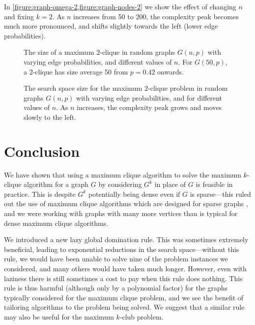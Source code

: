 \documentclass[letterpaper]{article}
\begin{document}
In \cref{figure:graph-omega-2,figure:graph-nodes-2} we show the effect of
changing $n$ and fixing $k = 2$. As $n$ increases from 50 to 200, the complexity peak becomes much
more pronounced, and shifts slightly towards the left (lower edge probabilities).

\begin{figure}[t]
    \centering
    
    \caption{The size of a maximum $2$-clique in random graphs $G(n, p)$ with varying edge
        probabilities, and different values of $n$. For $G(50, p)$, a $2$-clique has size average 50
    from $p = 0.42$ onwards.}
    \label{figure:graph-omega-2}
\end{figure}

\begin{figure}[t]
    \centering
    
    \caption{The search space size for the maximum $2$-clique problem in random graphs $G(n, p)$
        with varying edge probabilities, and for different values of $n$. As $n$ increases, the
    complexity peak grows and moves slowly to the left.}
    \label{figure:graph-nodes-2}
\end{figure}

\section{Conclusion}

We have shown that using a maximum clique algorithm to solve the maximum $k$-clique algorithm for a
graph $G$ by considering $G^k$ in place of $G$ is feasible in practice. This is despite $G^k$
potentially being dense even if $G$ is sparse---this ruled out the use of maximum clique algorithms
which are designed for sparse graphs
\cite{DBLP:conf/waw/PattabiramanPGLC13,DBLP:journals/cor/SegundoLP16}, and we were working with
graphs with many more vertices than is typical for dense maximum clique algorithms.

We introduced a new lazy global domination rule. This was sometimes extremely beneficial, leading to
exponential reductions in the search space---without this rule, we would have been unable to solve
nine of the problem instances we considered, and many others would have taken much longer. However,
even with laziness there is still sometimes a cost to pay when this rule does nothing. This rule is
thus harmful (although only by a polynomial factor) for the graphs typically considered for the
maximum clique problem, and we see the benefit of tailoring algorithms to the problem being solved.
We suggest that a similar rule may also be useful for the maximum $k$-club problem.
\end{document}
